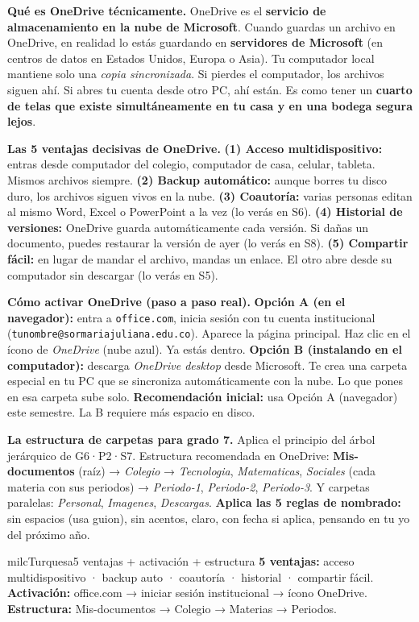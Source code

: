 \documentclass[11pt,letterpaper]{article}
\newcommand{\milcpaso}[3]{%
\Needspace{4\baselineskip}%
\begin{tcolorbox}[enhanced,colback=white,colframe=milcLinea,arc=1.5mm,boxrule=.9pt,
  left=14mm,right=4mm,top=3mm,bottom=3mm,before skip=4pt,after skip=4pt,
  fontupper=\RaggedRight,
  overlay={\node[anchor=north west,circle,fill=#2,text=white,inner sep=0pt,
    minimum size=7.4mm,font=\sffamily\bfseries\small]
    at ([xshift=3.6mm,yshift=-3.2mm]frame.north west) {#1};}]
#3
\end{tcolorbox}}
\begin{document}
\milcpaso{1}{milcTurquesa}{\textbf{Qué es OneDrive técnicamente.} OneDrive es el \textbf{servicio de almacenamiento en la nube de Microsoft}. Cuando guardas un archivo en OneDrive, en realidad lo estás guardando en \textbf{servidores de Microsoft} (en centros de datos en Estados Unidos, Europa o Asia). Tu computador local mantiene solo una \emph{copia sincronizada}. Si pierdes el computador, los archivos siguen ahí. Si abres tu cuenta desde otro PC, ahí están. Es como tener un \textbf{cuarto de telas que existe simultáneamente en tu casa y en una bodega segura lejos}.}
\milcpaso{2}{milcTurquesa}{\textbf{Las 5 ventajas decisivas de OneDrive.} \textbf{(1) Acceso multidispositivo:} entras desde computador del colegio, computador de casa, celular, tableta. Mismos archivos siempre. \textbf{(2) Backup automático:} aunque borres tu disco duro, los archivos siguen vivos en la nube. \textbf{(3) Coautoría:} varias personas editan al mismo Word, Excel o PowerPoint a la vez (lo verás en S6). \textbf{(4) Historial de versiones:} OneDrive guarda automáticamente cada versión. Si dañas un documento, puedes restaurar la versión de ayer (lo verás en S8). \textbf{(5) Compartir fácil:} en lugar de mandar el archivo, mandas un enlace. El otro abre desde su computador sin descargar (lo verás en S5).}
\milcpaso{3}{milcTurquesa}{\textbf{Cómo activar OneDrive (paso a paso real).} \textbf{Opción A (en el navegador):} entra a \texttt{office.com}, inicia sesión con tu cuenta institucional (\texttt{tunombre@sormariajuliana.edu.co}). Aparece la página principal. Haz clic en el ícono de \emph{OneDrive} (nube azul). Ya estás dentro. \textbf{Opción B (instalando en el computador):} descarga \emph{OneDrive desktop} desde Microsoft. Te crea una carpeta especial en tu PC que se sincroniza automáticamente con la nube. Lo que pones en esa carpeta sube solo. \textbf{Recomendación inicial:} usa Opción A (navegador) este semestre. La B requiere más espacio en disco.}
\milcpaso{4}{milcTurquesa}{\textbf{La estructura de carpetas para grado 7.} Aplica el principio del árbol jerárquico de G6·P2·S7. Estructura recomendada en OneDrive: \textbf{Mis-documentos} (raíz) → \emph{Colegio} → \emph{Tecnologia}, \emph{Matematicas}, \emph{Sociales} (cada materia con sus periodos) → \emph{Periodo-1}, \emph{Periodo-2}, \emph{Periodo-3}. Y carpetas paralelas: \emph{Personal}, \emph{Imagenes}, \emph{Descargas}. \textbf{Aplica las 5 reglas de nombrado:} sin espacios (usa guion), sin acentos, claro, con fecha si aplica, pensando en tu yo del próximo año.}

\begin{drawbox}{milcTurquesa}{5 ventajas + activación + estructura}
\textbf{5 ventajas:} acceso multidispositivo · backup auto · coautoría · historial · compartir fácil. \\[1mm]
\textbf{Activación:} office.com → iniciar sesión institucional → ícono OneDrive. \\[1mm]
\textbf{Estructura:} Mis-documentos → Colegio → Materias → Periodos.
\end{drawbox}
\end{document}
